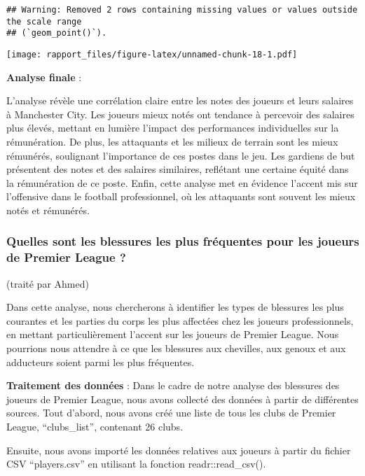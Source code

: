 \documentclass[
]{article}
\begin{document}
\begin{verbatim}
## Warning: Removed 2 rows containing missing values or values outside the scale range
## (`geom_point()`).
\end{verbatim}

\texttt{[image: rapport\_files/figure-latex/unnamed-chunk-18-1.pdf]}

\textbf{Analyse finale} :

L'analyse révèle une corrélation claire entre les notes des joueurs et
leurs salaires à Manchester City. Les joueurs mieux notés ont tendance à
percevoir des salaires plus élevés, mettant en lumière l'impact des
performances individuelles sur la rémunération. De plus, les attaquants
et les milieux de terrain sont les mieux rémunérés, soulignant
l'importance de ces postes dans le jeu. Les gardiens de but présentent
des notes et des salaires similaires, reflétant une certaine équité dans
la rémunération de ce poste. Enfin, cette analyse met en évidence
l'accent mis sur l'offensive dans le football professionnel, où les
attaquants sont souvent les mieux notés et rémunérés.

\subsubsection{\texorpdfstring{\textbf{Quelles sont les blessures les
plus fréquentes pour les joueurs de Premier League
?}}{Quelles sont les blessures les plus fréquentes pour les joueurs de Premier League ?}}\label{quelles-sont-les-blessures-les-plus-fruxe9quentes-pour-les-joueurs-de-premier-league}

(traité par Ahmed)

Dans cette analyse, nous chercherons à identifier les types de blessures
les plus courantes et les parties du corps les plus affectées chez les
joueurs professionnels, en mettant particulièrement l'accent sur les
joueurs de Premier League. Nous pourrions nous attendre à ce que les
blessures aux chevilles, aux genoux et aux adducteurs soient parmi les
plus fréquentes.

\textbf{Traitement des données} : Dans le cadre de notre analyse des
blessures des joueurs de Premier League, nous avons collecté des données
à partir de différentes sources. Tout d'abord, nous avons créé une liste
de tous les clubs de Premier League, ``clubs\_list'', contenant 26
clubs.

Ensuite, nous avons importé les données relatives aux joueurs à partir
du fichier CSV ``players.csv'' en utilisant la fonction
readr::read\_csv().
\end{document}
